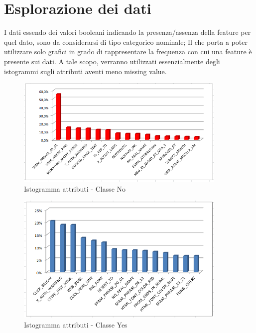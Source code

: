 \section{Esplorazione dei dati}
I dati essendo dei valori booleani indicando la presenza/assenza della feature per quel dato, sono da considerarsi di tipo categorico nominale; Il che porta a poter utilizzare solo grafici in grado di rappresentare la frequenza con cui una feature è presente sui dati. A tale scopo, verranno utilizzati essenzialmente degli istogrammi sugli attributi aventi meno missing value.

\begin{figure}[hbtp]
 	\centering
 	\includegraphics[width=0.9\textwidth]{./images/Histogram_No.png}
 	\caption{Istogramma attributi - Classe No}
 	\label{NoHist}
\end{figure}

\begin{figure}[hbtp]
	\centering
	\includegraphics[width=0.9\textwidth]{./images/Histogram_Yes.png}
	\caption{Istogramma attributi - Classe Yes}
	\label{YesHist}
\end{figure}